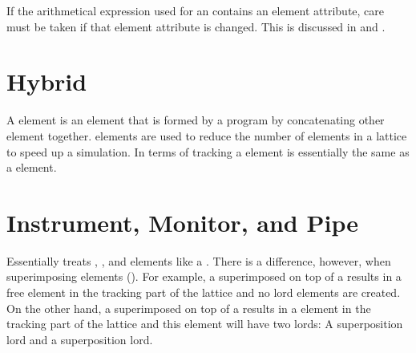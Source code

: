 If the arithmetical expression used for an  contains an element attribute, care must be
taken if that element attribute is changed. This is discussed in  and
.

\section{Hybrid}
\label{s:hybrid}

A  element is an element that is formed by a program by concatenating other element
together.  elements are used to reduce the number of elements in a lattice to speed up a
simulation. In terms of tracking a  element is essentially the same as a 
element.

\section{Instrument, Monitor, and Pipe}
\label{s:monitor}

Essentially \bmad treats , , and 
elements like a . There is a difference, however, when
superimposing elements (). For example, a
 superimposed on top of a  results in a free
 element in the tracking part of the lattice and no
lord elements are created. On the other hand, a 
superimposed on top of a  results in a 
element in the tracking part of the lattice and this 
element will have two lords: A  superposition lord and
a  superposition lord.

